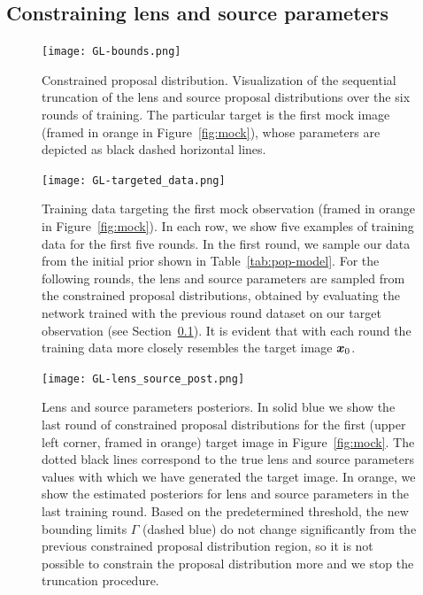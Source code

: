 \subsection{Constraining lens and source parameters}
\label{subsec:constrain}

\begin{figure}
	\centering
	\texttt{[image: GL-bounds.png]}
	\caption{Constrained proposal distribution. Visualization of the sequential truncation of the lens and source proposal distributions over the six rounds of training. The particular target is the first mock image (framed in orange in Figure~\ref{fig:mock}), whose parameters are depicted as black dashed horizontal lines.}
\label{fig:bounds}
\end{figure}

\begin{figure}
	\centering
	\texttt{[image: GL-targeted\_data.png]}
	\caption{Training data targeting the first mock observation (framed in orange in Figure~\ref{fig:mock}). In each row, we show five examples of training data for the first five rounds. In the first round, we sample our data from the initial prior shown in Table~\ref{tab:pop-model}. For the following rounds, the lens and source parameters are sampled from the constrained proposal distributions, obtained by evaluating the network trained with the previous round dataset on our target observation (see Section~\ref{subsec:constrain}). It is evident that with each round the training data more closely resembles the target image $\bm{x}_0$.}
\label{fig:targeted_data0}
\end{figure}

\begin{figure}
	\centering
	\texttt{[image: GL-lens\_source\_post.png]}
	\caption{Lens and source parameters posteriors. In solid blue we show the last round of constrained proposal distributions for the first (upper left corner, framed in orange) target image in Figure~\ref{fig:mock}. The dotted black lines correspond to the true lens and source parameters values with which we have generated the target image. In orange, we show the estimated posteriors for lens and source parameters in the last training round. Based on the predetermined threshold, the new bounding limits $\Gamma$ (dashed blue) do not change significantly from the previous constrained proposal distribution region, so it is not possible to constrain the proposal distribution more and we stop the truncation procedure.}
\label{fig:lens_source_post}
\end{figure}


